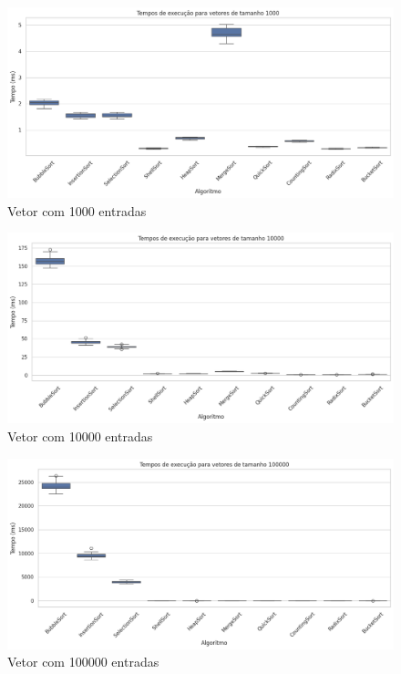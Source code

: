 \documentclass[
	article,			%
	11pt,				%
	oneside,			%
	a4paper,			%
	english,			%
	brazil,				%
	sumario=tradicional
	]{abntex2}
\begin{document}
\begin{figure}[h!]
    \centering
    \includegraphics[width=1\linewidth]{Tempo1000.png}
    \caption{Vetor com 1000 entradas}
    \label{fig:placeholder}
\end{figure}


\begin{figure}[h!]
    \centering
    \includegraphics[width=0.9\linewidth]{Tempo10000.png}
    \caption{Vetor com 10000 entradas}
    \label{fig:placeholder}
\end{figure}

\begin{figure}[h!]
    \centering
    \includegraphics[width=0.9\linewidth]{Tempo100000.png}
    \caption{Vetor com 100000 entradas}
    \label{fig:placeholder}
\end{figure}
\end{document}
